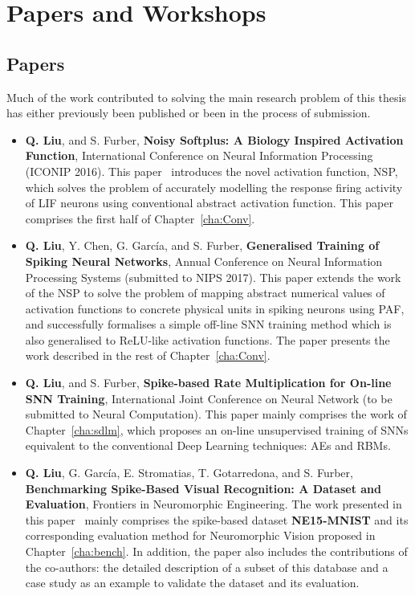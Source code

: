   
\section{Papers and Workshops}

\subsection{Papers}
	Much of the work contributed to solving the main research problem of this thesis has either previously been published or been in the process of submission.
\begin{itemize}

	\item 
	\textbf{Q. Liu}, and S. Furber, \textbf{Noisy Softplus: A Biology Inspired Activation Function}, International Conference on Neural Information Processing (ICONIP 2016). 
	This paper~\cite{liu2016noisy} introduces the novel activation function, NSP, 
	which solves the problem of accurately modelling the response firing activity of LIF neurons using conventional abstract activation function.
	This paper comprises the first half of Chapter~\ref{cha:Conv}.
	
	\item 
	\textbf{Q. Liu}, Y. Chen, G. Garc\'ia, and S. Furber, \textbf{Generalised Training of Spiking Neural Networks}, Annual Conference on Neural Information Processing Systems (submitted to NIPS 2017).
	This paper extends the work of the NSP to solve the problem of mapping abstract numerical values of activation functions to concrete physical units in spiking neurons using PAF, and successfully formalises a simple off-line SNN training method which is also generalised to ReLU-like activation functions.
	The paper presents the work described in the rest of Chapter~\ref{cha:Conv}.
	
	
	\item 
	\textbf{Q. Liu}, and S. Furber, \textbf{Spike-based Rate Multiplication for On-line SNN Training}, International Joint Conference on Neural Network (to be submitted to Neural Computation).
	This paper mainly comprises the work of Chapter~\ref{cha:sdlm}, which proposes an on-line unsupervised training of SNNs equivalent to the conventional Deep Learning techniques: AEs and RBMs.
	
	\item 
	\textbf{Q. Liu}, G. Garc\'ia, E. Stromatias, T. Gotarredona, and S. Furber, \textbf{Benchmarking Spike-Based Visual Recognition: A Dataset and Evaluation}, Frontiers in Neuromorphic Engineering.
	The work presented in this paper~\cite{liu2016bench} mainly comprises the spike-based dataset \textbf{NE15-MNIST} and its corresponding evaluation method for Neuromorphic Vision proposed in Chapter~\ref{cha:bench}.
	In addition, the paper also includes the contributions of the co-authors: the detailed description of a subset of this database and a case study as an example to validate the dataset and its evaluation. 
	
\end{itemize}

